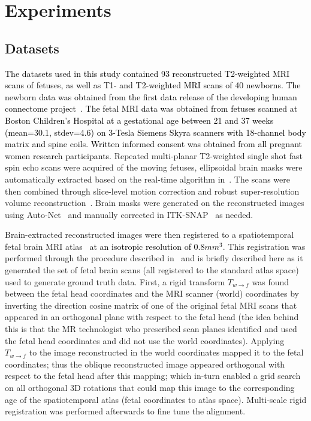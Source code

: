 \documentclass[journal,transmag]{IEEEtran}
\begin{document}
\section{Experiments}
\label{sec:results}
\subsection{Datasets}
\label{sec:datasets}
\textcolor{black}{The datasets used in this study contained 93 reconstructed T2-weighted MRI scans of fetuses, as well as T1- and T2-weighted MRI scans of 40 newborns. The newborn data was obtained from the first data release of the developing human connectome project~\cite{hughes2017developing}. The fetal MRI data was obtained from fetuses scanned at Boston Children's Hospital at a gestational age between 21 and 37 weeks (mean=30.1, stdev=4.6) on 3-Tesla Siemens Skyra scanners with 18-channel body matrix and spine coils. Written informed consent was obtained from all pregnant women research participants.} Repeated multi-planar T2-weighted single shot fast spin echo scans were acquired of the moving fetuses, ellipsoidal brain masks were automatically extracted based on the real-time algorithm in~\cite{salehi2018real}. The scans were then combined through slice-level motion correction and robust super-resolution volume reconstruction~\cite{gholipour2010robust,kainz2015fast}. Brain masks were generated on the reconstructed images using Auto-Net~\cite{salehi2017auto} and manually corrected in ITK-SNAP~\cite{yushkevich2006user} as needed.

Brain-extracted reconstructed images were then registered to a spatiotemporal fetal brain MRI atlas~\cite{gholipour2017normative} \textcolor{black}{at an isotropic resolution of $0.8mm^3$}. This registration was performed through the procedure described in~\cite{gholipour2017normative} and is briefly described here as it generated the set of fetal brain scans (all registered to the standard atlas space) used to generate ground truth data. First, a rigid transform $T_{w\rightarrow f}$ was found between the fetal head coordinates and the MRI scanner (world) coordinates by inverting the direction cosine matrix of one of the original fetal MRI scans that appeared in an orthogonal plane with respect to the fetal head (the idea behind this is that the MR technologist who prescribed scan planes identified and used the fetal head coordinates and did not use the world coordinates). Applying $T_{w\rightarrow f}$ to the image reconstructed in the world coordinates mapped it to the fetal coordinates; thus the oblique reconstructed image appeared orthogonal with respect to the fetal head after this mapping; which in-turn enabled a grid search on all orthogonal 3D rotations that could map this image to the corresponding age of the spatiotemporal atlas (fetal coordinates to atlas space). Multi-scale rigid registration was performed afterwards to fine tune the alignment.
\end{document}
